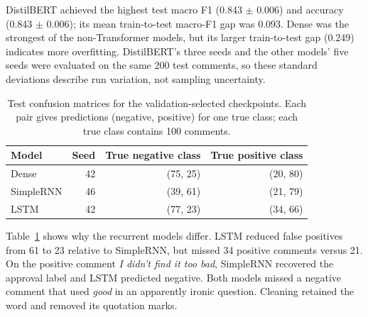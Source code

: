 DistilBERT achieved the highest test macro F1 (0.843 $\pm$ 0.006) and
accuracy (0.843 $\pm$ 0.006); its mean train-to-test macro-F1 gap was 0.093.
Dense was the strongest of the non-Transformer models, but its larger
train-to-test gap (0.249) indicates more overfitting. DistilBERT's three
seeds and the other models' five seeds were evaluated on the same 200 test
comments, so these standard deviations describe run variation, not sampling
uncertainty.

\begin{table}[t]
\caption{Test confusion matrices for the validation-selected checkpoints.
Each pair gives predictions (negative, positive) for one true class;
each true class contains 100 comments.}
\label{tab:neural-confusion}
\centering\footnotesize
\begin{tabular}{@{}lrrr@{}}
\toprule
Model & Seed & True negative class & True positive class\\
\midrule
Dense & 42 & (75, 25) & (20, 80)\\
SimpleRNN & 46 & (39, 61) & (21, 79)\\
LSTM & 42 & (77, 23) & (34, 66)\\
\bottomrule
\end{tabular}
\end{table}

Table~\ref{tab:neural-confusion} shows why the recurrent models differ.
LSTM reduced false positives from 61 to 23 relative to SimpleRNN, but
missed 34 positive comments versus 21. On the positive comment
\emph{I didn't find it too bad}, SimpleRNN recovered the approval label and
LSTM predicted negative. Both models missed a negative comment that used
\emph{good} in an apparently ironic question. Cleaning retained the word
and removed its quotation marks.
